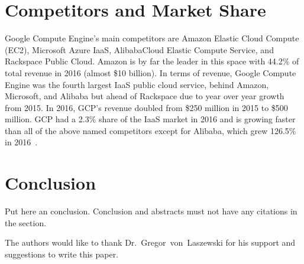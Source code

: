 \section{Competitors and Market Share}

Google Compute Engine's main competitors are Amazon Elastic Cloud
Compute (EC2), Microsoft Azure IaaS, AlibabaCloud Elastic Compute
Service, and Rackspace Public Cloud. Amazon is by far the leader in
this space with 44.2\% of total revenue in 2016 (almost \$10
billion). In terms of revenue, Google Compute Engine was the fourth
largest IaaS public cloud service, behind Amazon, Microsoft, and
Alibaba but ahead of Rackspace due to year over year growth from
2015. In 2016, GCP's revenue doubled from \$250 million in 2015
to \$500 million. GCP had a 2.3\% share of the IaaS market in 2016 and
is growing faster than all of the above named competitors except for
Alibaba, which grew 126.5\% in
2016~\cite{hid-sp18-419-gartnerpr2017}.


\section{Conclusion}

Put here an conclusion. Conclusion and abstracts must not have any
citations in the section.


\begin{acks}

  The authors would like to thank Dr.~Gregor~von~Laszewski for his
  support and suggestions to write this paper.

\end{acks}


 

